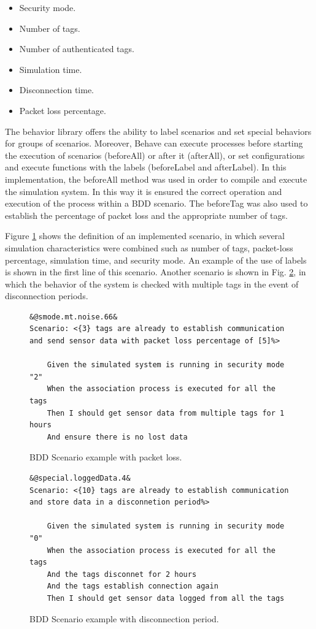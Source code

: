 \documentclass[journal]{IEEEtran}	%
\begin{document}
\begin{itemize}
    \item Security mode.
    \item Number of tags.
    \item Number of authenticated tags.
    \item Simulation time.
    \item Disconnection time.
    \item Packet loss percentage.
\end{itemize}

The behavior library offers the ability to label scenarios and set special behaviors for groups of scenarios. Moreover, Behave can execute processes before starting the execution of scenarios (beforeAll) or after it (afterAll), or set configurations and execute functions with the labels (beforeLabel and afterLabel). In this implementation, the beforeAll method was used in order to compile and execute the simulation system. In this way it is ensured the correct operation and execution of the process within a BDD scenario. The beforeTag was also used to establish the percentage of packet loss and the appropriate number of tags.

Figure \ref{fig:bddScenario1} shows the definition of an implemented scenario, in which several simulation characteristics were combined such as number of tags, packet-loss percentage, simulation time, and security mode. An example of the use of labels is shown in the first line of this scenario. Another scenario is shown in Fig. \ref{fig:bddScenario2}, in which the behavior of the system is checked with multiple tags in the event of disconnection periods.

\begin{figure}[t!]
\centering
\begin{lstlisting}[style=scenarioStyle]
&@smode.mt.noise.66&
Scenario: <{3} tags are already to establish communication and send sensor data with packet loss percentage of [5]%>
    
    Given the simulated system is running in security mode "2"
    When the association process is executed for all the tags
    Then I should get sensor data from multiple tags for 1 hours
    And ensure there is no lost data
\end{lstlisting}
\caption{BDD Scenario example with packet loss.}
\label{fig:bddScenario1}
\end{figure}

\begin{figure}[t!]
\centering
\begin{lstlisting}[style=scenarioStyle]
&@special.loggedData.4&
Scenario: <{10} tags are already to establish communication and store data in a disconnetion period%>
    
    Given the simulated system is running in security mode "0"
    When the association process is executed for all the tags
    And the tags disconnet for 2 hours
    And the tags establish connection again
    Then I should get sensor data logged from all the tags
\end{lstlisting}
\caption{BDD Scenario example with disconnection period.}
\label{fig:bddScenario2}
\end{figure}
\end{document}
